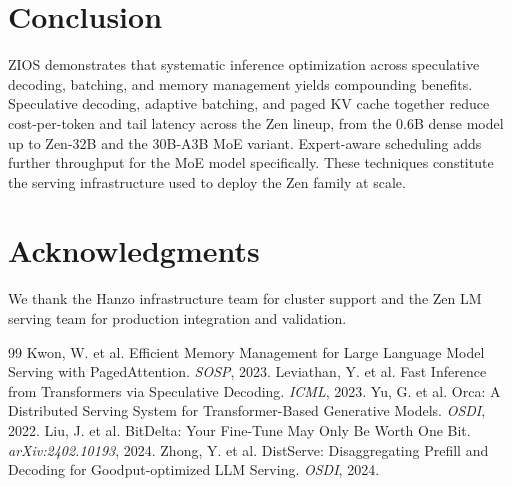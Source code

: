 \documentclass[11pt,a4paper]{article}
\begin{document}
\section{Conclusion}

ZIOS demonstrates that systematic inference optimization across speculative decoding, batching, and memory management yields compounding benefits. Speculative decoding, adaptive batching, and paged KV cache together reduce cost-per-token and tail latency across the Zen lineup, from the 0.6B dense model up to Zen-32B and the 30B-A3B MoE variant. Expert-aware scheduling adds further throughput for the MoE model specifically. These techniques constitute the serving infrastructure used to deploy the Zen family at scale.

\section*{Acknowledgments}

We thank the Hanzo infrastructure team for cluster support and the Zen LM serving team for production integration and validation.

\begin{thebibliography}{99}
 Kwon, W. et al. Efficient Memory Management for Large Language Model Serving with PagedAttention. \textit{SOSP}, 2023.
 Leviathan, Y. et al. Fast Inference from Transformers via Speculative Decoding. \textit{ICML}, 2023.
 Yu, G. et al. Orca: A Distributed Serving System for Transformer-Based Generative Models. \textit{OSDI}, 2022.
 Liu, J. et al. BitDelta: Your Fine-Tune May Only Be Worth One Bit. \textit{arXiv:2402.10193}, 2024.
 Zhong, Y. et al. DistServe: Disaggregating Prefill and Decoding for Goodput-optimized LLM Serving. \textit{OSDI}, 2024.
\end{thebibliography}
\end{document}

